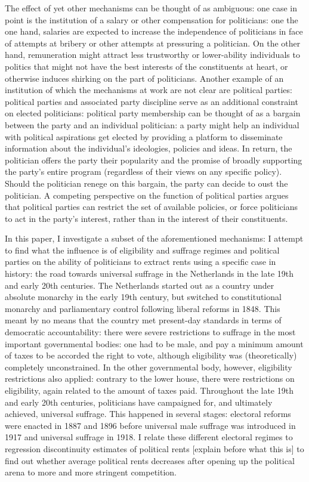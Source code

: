 \documentclass[]{book}
\begin{document}
The effect of yet other mechanisms can be thought of as ambiguous: one case in point is the institution of a salary or other compensation for politicians: one the one hand, salaries are expected to increase the independence of politicians in face of attempts at bribery or other attempts at pressuring a politician. On the other hand, remuneration might attract less trustworthy or lower-ability individuals to politics that might not have the best interests of the constituents at heart, or otherwise induces shirking on the part of politicians. Another example of an institution of which the mechanisms at work are not clear are political parties: political parties and associated party discipline serve as an additional constraint on elected politicians: political party membership can be thought of as a bargain between the party and an individual politician: a party might help an individual with political aspirations get elected by providing a platform to disseminate information about the individual's ideologies, policies and ideas. In return, the politician offers the party their popularity and the promise of broadly supporting the party's entire program (regardless of their views on any specific policy). Should the politician renege on this bargain, the party can decide to oust the politician. A competing perspective on the function of political parties argues that political parties can restrict the set of available policies, or force politicians to act in the party's interest, rather than in the interest of their constituents.

In this paper, I investigate a subset of the aforementioned mechanisms: I attempt to find what the influence is of eligibility and suffrage regimes and political parties on the ability of politicians to extract rents using a specific case in history: the road towards universal suffrage in the Netherlands in the late 19th and early 20th centuries. The Netherlands started out as a country under absolute monarchy in the early 19th century, but switched to constitutional monarchy and parliamentary control following liberal reforms in 1848. This meant by no means that the country met present-day standards in terms of democratic accountability: there were severe restrictions to suffrage in the most important governmental bodies: one had to be male, and pay a minimum amount of taxes to be accorded the right to vote, although eligibility was (theoretically) completely unconstrained. In the other governmental body, however, eligibility restrictions also applied: contrary to the lower house, there were restrictions on eligibility, again related to the amount of taxes paid. Throughout the late 19th and early 20th centuries, politicians have campaigned for, and ultimately achieved, universal suffrage. This happened in several stages: electoral reforms were enacted in 1887 and 1896 before universal male suffrage was introduced in 1917 and universal suffrage in 1918. I relate these different electoral regimes to regression discontinuity estimates of political rents {[}explain before what this is{]} to find out whether average political rents decreases after opening up the political arena to more and more stringent competition.
\end{document}
